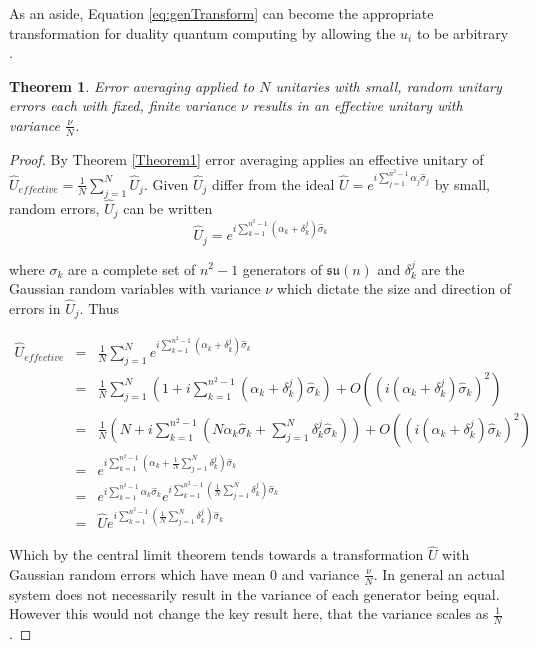 \documentclass[aps,pra,twocolumn,superscriptaddress,numerical]{revtex4-1}
\newtheorem{thm}{Theorem}
\begin{document}
	As an aside, Equation \ref{eq:genTransform} can become the appropriate transformation for duality quantum computing by allowing the $u_{i}$ to be arbitrary \cite{dualityQC}.
	
	\begin{thm} \label{Theorem2}
		Error averaging applied to $N$ unitaries with small, random unitary errors each with fixed, finite variance $\nu$ results in an effective unitary with variance $\frac{\nu}{N}$.
	\end{thm}

	\begin{proof}
		By Theorem \ref{Theorem1} error averaging applies an effective unitary of $\hat{U}_{effective}=\frac{1}{N}\sum_{j=1}^{N}\hat{U}_{j}$. Given $\hat{U}_{j}$ differ from the ideal $\hat{U}=e^{i\sum_{j=1}^{n^2-1}\alpha_{j}\hat{\sigma}_{j}}$  by small,  random errors, $\hat{U}_{j}$ can be written
		\begin{equation}
			\hat{U}_{j}=e^{i\sum_{k=1}^{n^2-1}\left(\alpha_{k}+\delta_{k}^{j}\right)\hat{\sigma}_{k}}
		\end{equation}
	
		where $\sigma_{k}$ are a complete set of $n^2-1$ generators of $\mathfrak{su}(n)$ and $\delta_{k}^{j}$ are the Gaussian random variables with variance $\nu$ which dictate the size and direction of errors in $\hat{U}_{j}$. Thus
	
		\begin{widetext}
			\begin{eqnarray}
				\hat{U}_{effective} &=& \frac{1}{N}\sum_{j=1}^{N}e^{i\sum_{k=1}^{n^2-1}\left(\alpha_{k}+\delta_{k}^{j}\right)\hat{\sigma}_{k}} \\
				&=& \frac{1}{N}\sum_{j=1}^{N}\left(1+i\sum_{k=1}^{n^2-1}\left(\alpha_{k}+\delta_{k}^{j}\right)\hat{\sigma}_{k}\right) +O\left(\left(i\left(\alpha_{k}+\delta_{k}^{j}\right)\hat{\sigma}_{k}\right)^{2}\right) \\
				&=& \frac{1}{N}\left(N+i\sum_{k=1}^{n^2-1}\left(N\alpha_{k}\hat{\sigma}_{k}+\sum_{j=1}^{N}\delta_{k}^{j}\hat{\sigma}_{k}\right)\right)+O\left(\left(i\left(\alpha_{k}+\delta_{k}^{j}\right)\hat{\sigma}_{k}\right)^{2}\right) \\
				&=& e^{i\sum_{k=1}^{n^2-1}\left(\alpha_{k}+\frac{1}{N}\sum_{j=1}^{N}\delta_{k}^{j}\right)\hat{\sigma}_{k}} \\
				&=& e^{i\sum_{k=1}^{n^2-1}\alpha_{k}\hat{\sigma}_{k}} e^{i\sum_{k=1}^{n^2-1}\left(\frac{1}{N}\sum_{j=1}^{N}\delta_{k}^{j}\right)\hat{\sigma}_{k}} \\
				&=& \hat{U}e^{i\sum_{k=1}^{n^2-1}\left(\frac{1}{N}\sum_{j=1}^{N}\delta_{k}^{j}\right)\hat{\sigma}_{k}}
			\end{eqnarray}
		\end{widetext}
	
		Which by the central limit theorem tends towards a transformation $\hat{U}$ with Gaussian random errors which have mean $0$ and variance $\frac{\nu}{N}$. In general an actual system does not necessarily result in the variance of each generator being equal. However this would not change the key result here, that the variance scales as $\frac{1}{N}$.
	\end{proof}
\end{document}
